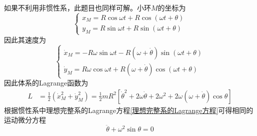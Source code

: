 \begin{solution}
如果不利用非惯性系，此题目也同样可解。小环$M$的坐标为
\begin{equation*}
	\begin{cases}
		x_M = R\cos \omega t + R\cos (\omega t+\theta) \\
		y_M = R\sin \omega t + R\sin (\omega t+\theta)
	\end{cases}
\end{equation*}
因此其速度为
\begin{equation*}
	\begin{cases}
		\dot{x}_M = -R\omega \sin \omega t - R(\omega + \dot{\theta}) \sin (\omega t+\theta) \\
		\dot{y}_M = R \omega \cos \omega t + R(\omega + \dot{\theta}) \cos (\omega t+\theta)
	\end{cases}
\end{equation*}
因此体系的Lagrange函数为
\begin{align*}
	L & = \frac12 (\dot{x}_M^2 + \dot{y}_M^2) = \frac12 mR^2 \left[\dot{\theta}^2 + 2\omega \dot{\theta} + 2\omega^2 + 2\omega(\omega+ \dot{\theta}) \cos \theta\right]
\end{align*}
根据惯性系中理想完整系的Lagrange方程\eqref{理想完整系的Lagrange方程}可得相同的运动微分方程
\begin{equation*}
	\ddot{\theta} + \omega^2 \sin \theta = 0
\end{equation*}
\end{solution}

